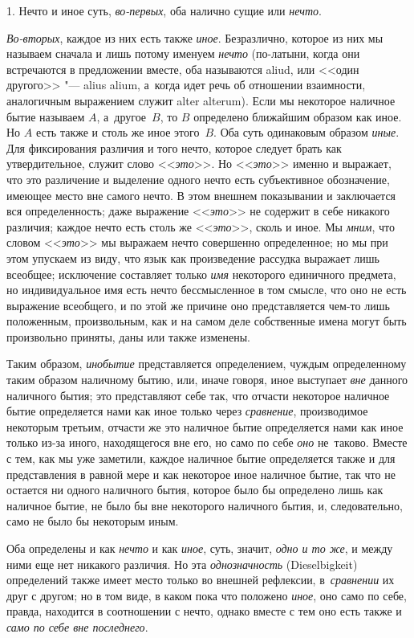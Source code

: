 1. Нечто и иное суть, {\em во-первых}, оба налично сущие или {\em нечто}.

{\em Во-вторых}, каждое из них есть также {\em иное}. Безразлично, которое из
них мы называем сначала и лишь потому именуем {\em нечто} (по-латыни, когда они
встречаются в предложении вместе, оба называются aliud, или <<один другого>>
"--- alius alium, а~когда идет речь об отношении взаимности, аналогичным
выражением служит alter alterum). Если мы некоторое наличное бытие называем
$A$, а~другое~$B$, то $B$ определено ближайшим образом как иное. Но $A$ есть
также и столь же иное этого~$B$. Оба суть одинаковым образом {\em иные}. Для
фиксирования различия и того нечто, которое следует брать как утвердительное,
служит слово <<{\em это}>>. Но <<{\em это}>> именно и выражает, что это
различение и выделение одного нечто есть субъективное обозначение, имеющее
место вне самого нечто. В этом внешнем показывании и заключается вся
определенность; даже выражение <<{\em это}>> не содержит в себе никакого
различия; каждое нечто есть столь же <<{\em это}>>, сколь и иное. Мы
{\em мним}, что словом <<{\em это}>> мы выражаем нечто совершенно определенное;
но мы при этом упускаем из виду, что язык как произведение рассудка выражает
лишь всеобщее; исключение составляет только {\em имя} некоторого единичного
предмета, но индивидуальное имя есть нечто бессмысленное в том смысле, что оно
не есть выражение всеобщего, и по этой же причине оно представляется чем-то
лишь положенным, произвольным, как и на самом деле собственные имена могут быть
произвольно приняты, даны или также изменены.

Таким образом, {\em инобытие} представляется определением, чуждым определенному
таким образом наличному бытию, или, иначе говоря, иное выступает {\em вне}
данного наличного бытия; это представляют себе так, что отчасти некоторое
наличное бытие определяется нами как иное только через {\em сравнение},
производимое некоторым третьим, отчасти же это наличное бытие определяется нами
как иное только из-за иного, находящегося вне его, но само по себе {\em оно}
не~таково. Вместе с тем, как мы уже заметили, каждое наличное бытие
определяется также и для представления в равной мере и как некоторое иное
наличное бытие, так что не остается ни одного наличного бытия, которое было бы
определено лишь как наличное бытие, не было бы вне некоторого наличного бытия,
и, следовательно, само не было бы некоторым иным.

Оба определены и как {\em нечто} и как {\em иное}, суть, значит,
{\em одно и то же}, и между ними еще нет никакого различия. Но эта
{\em однозначность} (Dieselbigkeit) определений также имеет место только во
внешней рефлексии, в~{\em сравнении} их друг с другом; но в том виде, в каком
пока что положено {\em иное}, оно само по себе, правда, находится в соотношении
с нечто, однако вместе с тем оно есть также и
{\em само по себе вне последнего}.

